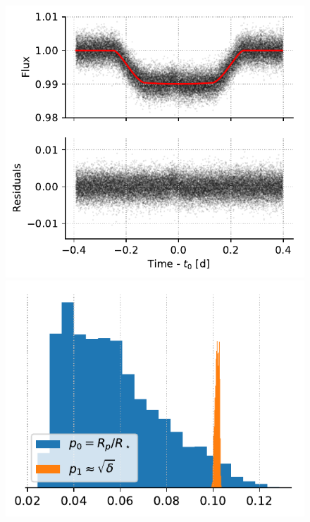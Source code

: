 \begin{figure}%
    \centering
    \includegraphics[scale=0.5]{robin/hd80606_residuals.pdf}
    \includegraphics[scale=0.5]{robin/hd80606_agreement.pdf}

\end{figure}
